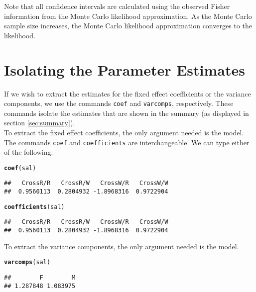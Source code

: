 \documentclass[11pt]{article}\usepackage[]{graphicx}\usepackage[]{color}
\makeatletter
\newcommand{\hlstd}[1]{\textcolor[rgb]{0.345,0.345,0.345}{#1}}%
\newcommand{\hlkwd}[1]{\textcolor[rgb]{0.737,0.353,0.396}{\textbf{#1}}}%
\newenvironment{kframe}{%
 \def\at@end@of@kframe{}%
 \ifinner\ifhmode%
  \def\at@end@of@kframe{\end{minipage}}%
  \begin{minipage}{\columnwidth}%
 \fi\fi%
 \def\FrameCommand##1{\hskip\@totalleftmargin \hskip-\fboxsep
 \colorbox{shadecolor}{##1}\hskip-\fboxsep
     \hskip-\linewidth \hskip-\@totalleftmargin \hskip\columnwidth}%
 \MakeFramed {\advance\hsize-\width
   \@totalleftmargin\z@ \linewidth\hsize
   \@setminipage}}%
 {\par\unskip\endMakeFramed%
 \at@end@of@kframe}
\newenvironment{knitrout}{}{} %
\makeatother
\begin{document}
Note that all confidence intervals are calculated using the observed Fisher information from the Monte Carlo likelihood approximation. As the Monte Carlo sample size increases, the Monte Carlo likelihood approximation converges to the likelihood.\\

\section{Isolating the Parameter Estimates}\label{sec:coefs}
If we wish to extract the estimates for the fixed effect coefficients or the variance components, we use the commands \texttt{coef} and \texttt{varcomps}, respectively. These commands isolate the estimates that are shown in the summary (as displayed in section \ref{sec:summary}).\\

 To extract the fixed effect coefficients, the only argument needed is the model. The commands \texttt{coef} and \texttt{coefficients} are interchangeable. We can type either of the following:
\begin{knitrout}
\color{fgcolor}\begin{kframe}
\begin{alltt}
\hlkwd{coef}\hlstd{(sal)}
\end{alltt}
\begin{verbatim}
##   CrossR/R   CrossR/W   CrossW/R   CrossW/W 
##  0.9560113  0.2804932 -1.8968316  0.9722904
\end{verbatim}
\begin{alltt}
\hlkwd{coefficients}\hlstd{(sal)}
\end{alltt}
\begin{verbatim}
##   CrossR/R   CrossR/W   CrossW/R   CrossW/W 
##  0.9560113  0.2804932 -1.8968316  0.9722904
\end{verbatim}
\end{kframe}
\end{knitrout}

To extract the variance components, the only argument needed is the model. \\
\begin{knitrout}
\color{fgcolor}\begin{kframe}
\begin{alltt}
\hlkwd{varcomps}\hlstd{(sal)}
\end{alltt}
\begin{verbatim}
##        F        M 
## 1.287848 1.083975
\end{verbatim}
\end{kframe}
\end{knitrout}
\end{document}
